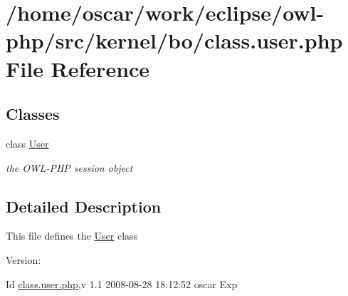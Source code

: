 \hypertarget{class_8user_8php}{
\section{/home/oscar/work/eclipse/owl-php/src/kernel/bo/class.user.php File Reference}
\label{class_8user_8php}
}
\subsection*{Classes}
\begin{CompactItemize}
\item 
class \hyperlink{classUser}{User}
\begin{CompactList}\small\item\em the OWL-PHP session object \item\end{CompactList}\end{CompactItemize}


\subsection{Detailed Description}
This file defines the \hyperlink{classUser}{User} class \begin{Desc}
\item[Version:]\end{Desc}
\begin{Desc}
\item[Id]\hyperlink{class_8user_8php}{class.user.php},v 1.1 2008-08-28 18:12:52 oscar Exp \end{Desc}
